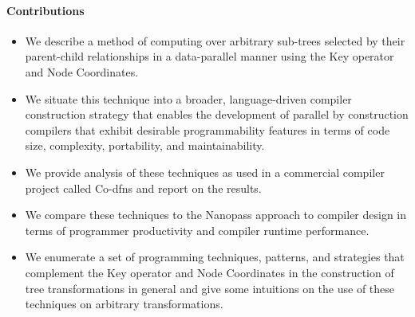 \documentclass[numbers,preprint]{sigplanconf}
\begin{document}
\paragraph{Contributions}

\begin{itemize}[noitemsep]
\item We describe a method of computing over arbitrary sub-trees selected by their parent-child 
relationships in a data-parallel manner using the Key operator and Node Coordinates.
\item We situate this technique into a broader, language-driven compiler construction strategy 
that enables the development of parallel by construction compilers that exhibit desirable programmability 
features in terms of code size, complexity, portability, and maintainability. 
\item We provide analysis of these techniques as used in a commercial compiler project called Co-dfns and 
report on the results.
\item We compare these techniques to the Nanopass approach to compiler design in terms of programmer 
productivity and compiler runtime performance. 
\item We enumerate a set of programming techniques, patterns, and strategies that complement the 
Key operator and Node Coordinates in the construction of tree transformations in general and give some 
intuitions on the use of these techniques on arbitrary transformations.
\end{itemize}
\end{document}
